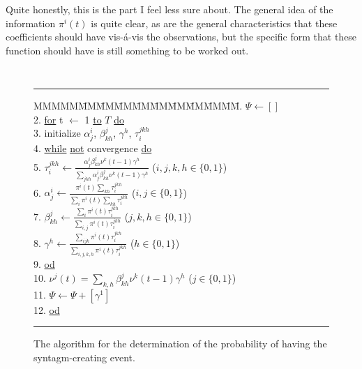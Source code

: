 \documentclass[10pt]{article}
\newcommand{\cmd}[1]      {\underline{{#1}}}
\newcommand{\cb}          {\begin{tabbing}MMMMM\=MM\=MM\=MM\=MM\=MM\=MM\=MM\=MM\=MM\= \kill}
\newcommand{\ce}          {\end{tabbing}}
\begin{document}
Quite honestly, this is the part I feel less sure about. The general
idea of the information $\pi^i(t)$ is quite clear, as are the general
characteristics that these coefficients should have vis-\'a-vis the
observations, but the specific form that these function should have is
still something to be worked out.
%
%
\begin{figure}[htbp]
  {\tt
    \rule{\textwidth}{0.5pt}
    \cb
    1.  \> $\Psi \leftarrow []$ \\
    2.  \> \cmd{for} t $\leftarrow$ 1 \cmd{to} $T$ \cmd{do} \\
    3.  \> \> initialize $\alpha_j^i$, $\beta_{kh}^j$, $\gamma^h$, $\tau_i^{jkh}$ \\
    4.  \> \> \cmd{while} \cmd{not} convergence \cmd{do} \\
    5.  \> \> \> $\displaystyle   \tau_i^{jkh} \leftarrow \frac{\alpha_j^i \beta_{kh}^j \nu^k(t-1) \gamma^h}
                                                {\displaystyle \sum_{jkh} \alpha_j^i \beta_{kh}^j \nu^k(t-1) \gamma^h}$ ($i,j,k,h\in\{0,1\}$) \\
    6.  \> \> \> $\displaystyle \alpha_j^i \leftarrow \frac{\displaystyle \pi^i(t) \sum_{kh} \tau_i^{jkh}}{\displaystyle \sum_i \pi^i(t) \sum_{kh} \tau_i^{jkh}}$ ($i,j\in\{0,1\}$) \\
    7.  \> \> \> $\displaystyle \beta_{kh}^j \leftarrow \frac{\displaystyle \sum_i \pi^i(t) \tau_i^{jkh}}{\displaystyle \sum_{i,j} \pi^i(t) \tau_i^{jkh}}$ ($j,k,h\in\{0,1\}$) \\
    8.  \> \> \> $\gamma^h \leftarrow \frac{\displaystyle \sum_{ijk} \pi^i(t) \tau_i^{jkh}}{\displaystyle \sum_{i,j,k,h} \pi^i(t) \tau_i^{jkh}}$ ($h\in\{0,1\}$) \\
    9.  \> \> \cmd{od} \\
    10. \> \> $\displaystyle \nu^j(t) = \sum_{k,h} \beta_{kh}^j \nu^k(t-1) \gamma^h$ ($j\in\{0,1\}$) \\
    11. \> \> $\Psi \leftarrow \Psi + [\gamma^1]$ \\
    12. \> \cmd{od}
    \ce
  }
  \caption{The algorithm for the determination of the probability of
    having the syntagm-creating event.}
  \label{algo}
  \rule{\textwidth}{0.5pt}
\end{figure}


% 
%
%
\end{document}
